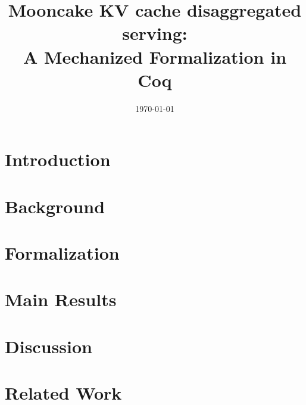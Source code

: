 \documentclass[11pt,a4paper]{article}
\title{Mooncake KV cache disaggregated serving:\\
       A Mechanized Formalization in Coq}
\author{}
\date{\today}
\theoremstyle{definition}
\theoremstyle{remark}
\newcommand{\coq}[1]{\lstinline[style=coq]{#1}}
\begin{document}
\maketitle

\begin{abstract}
\end{abstract}

\section{Introduction}
\label{sec:intro}


\section{Background}
\label{sec:background}


\section{Formalization}
\label{sec:formalization}


\section{Main Results}
\label{sec:results}


\section{Discussion}
\label{sec:discussion}


\section{Related Work}
\label{sec:related}



\end{document}

